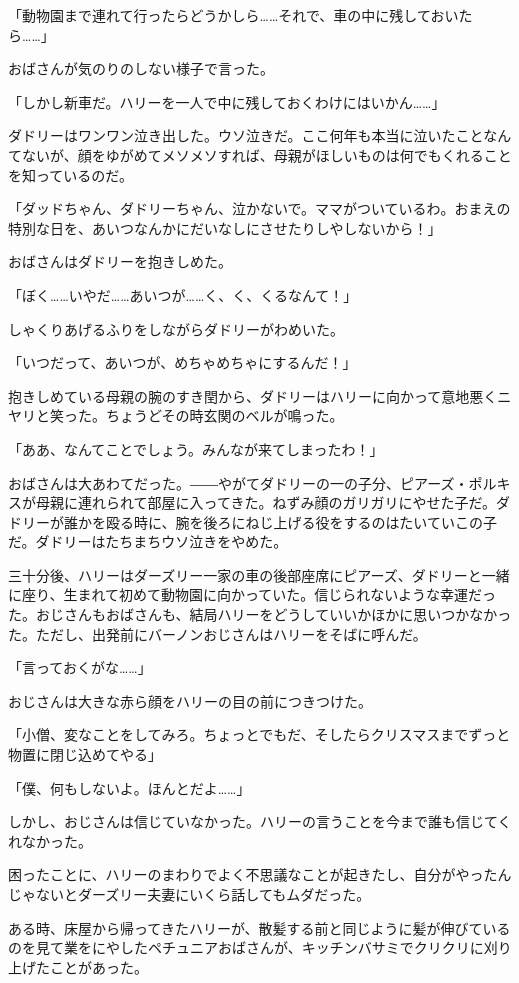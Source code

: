 \documentclass[10pt,a4paper]{article}
\begin{document}
\begin{CJK}{UTF8}{min}
「動物園まで連れて行ったらどうかしら……それで、車の中に残しておいたら……」

おばさんが気のりのしない様子で言った。

「しかし新車だ。ハリーを一人で中に残しておくわけにはいかん……」

ダドリーはワンワン泣き出した。ウソ泣きだ。ここ何年も本当に泣いたことなんてないが、顔をゆがめてメソメソすれば、母親がほしいものは何でもくれることを知っているのだ。

「ダッドちゃん、ダドリーちゃん、泣かないで。ママがついているわ。おまえの特別な日を、あいつなんかにだいなしにさせたりしやしないから！」

おばさんはダドリーを抱きしめた。

「ぼく……いやだ……あいつが……く、く、くるなんて！」

しゃくりあげるふりをしながらダドリーがわめいた。

「いつだって、あいつが、めちゃめちゃにするんだ！」

抱きしめている母親の腕のすき閏から、ダドリーはハリーに向かって意地悪くニヤリと笑った。ちょうどその時玄関のベルが鳴った。

「ああ、なんてことでしょう。みんなが来てしまったわ！」

おばさんは大あわてだった。――やがてダドリーの一の子分、ピアーズ・ポルキスが母親に連れられて部屋に入ってきた。ねずみ顔のガリガリにやせた子だ。ダドリーが誰かを殴る時に、腕を後ろにねじ上げる役をするのはたいていこの子だ。ダドリーはたちまちウソ泣きをやめた。

三十分後、ハリーはダーズリー一家の車の後部座席にピアーズ、ダドリーと一緒に座り、生まれて初めて動物園に向かっていた。信じられないような幸運だった。おじさんもおばさんも、結局ハリーをどうしていいかほかに思いつかなかった。ただし、出発前にバーノンおじさんはハリーをそばに呼んだ。

「言っておくがな……」

おじさんは大きな赤ら顔をハリーの目の前につきつけた。

「小僧、変なことをしてみろ。ちょっとでもだ、そしたらクリスマスまでずっと物置に閉じ込めてやる」

「僕、何もしないよ。ほんとだよ……」

しかし、おじさんは信じていなかった。ハリーの言うことを今まで誰も信じてくれなかった。

困ったことに、ハリーのまわりでよく不思議なことが起きたし、自分がやったんじゃないとダーズリー夫妻にいくら話してもムダだった。

ある時、床屋から帰ってきたハリーが、散髪する前と同じように髪が伸びているのを見て業をにやしたペチュニアおばさんが、キッチンバサミでクリクリに刈り上げたことがあった。


\end{CJK}
\end{document}
